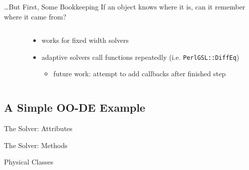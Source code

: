 \documentclass[mathserif]{beamer}
\providecommand{\code}[1]{{\texttt{\scriptsize{#1}}}}
\begin{document}
\begin{frame}{\ldots But First, Some Bookkeeping}
  If an object knows where it is, can it remember where it came from?
  \begin{columns}
    \begin{column}{0.49\linewidth}
      \begin{block}{}
        \scriptsize
        
      \end{block}
    \end{column}
    \begin{column}{0.49\linewidth}
      \begin{itemize}
        \item works for fixed width solvers
        \item adaptive solvers call functions repeatedly (i.e. \code{PerlGSL::DiffEq})
          \begin{itemize}
            \item future work: attempt to add callbacks after finished step
          \end{itemize}
      \end{itemize}
    \end{column}
  \end{columns}
\end{frame}

\subsection{A Simple OO-DE Example}

\begin{frame}{The Solver: Attributes}
  \begin{block}{}
    \scriptsize
    
  \end{block}
\end{frame}

\begin{frame}{The Solver: Methods}
  \begin{block}{}
    \scriptsize
    
  \end{block}
\end{frame}

\begin{frame}{Physical Classes}
  \begin{block}{}
    \scriptsize
    
  \end{block}
\end{frame}
\end{document}
